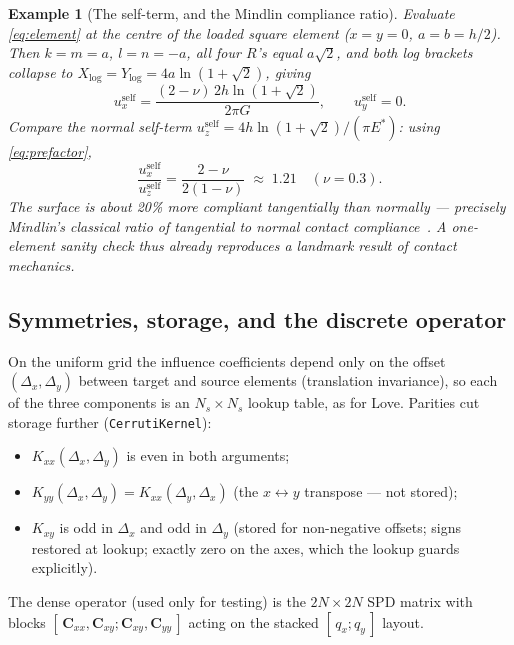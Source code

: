 \documentclass[11pt,a4paper]{article}
\newtheorem{example}[theorem]{Example}
\newcommand{\bC}{\mathbf{C}}
\newcommand{\Estar}{E^{*}}
\newcommand{\code}[1]{\texttt{#1}}
\begin{document}
\begin{example}[The self-term, and the Mindlin compliance ratio]
\label{ex:selfterm}
Evaluate \eqref{eq:element} at the centre of the loaded square element
($x=y=0$, $a=b=h/2$). Then $k=m=a$, $l=n=-a$, all four $R$'s equal
$a\sqrt2$, and both log brackets collapse to
$X_{\log} = Y_{\log} = 4a \ln(1+\sqrt2)$, giving
\begin{equation}
  u_x^{\text{self}} = \frac{(2-\nu)\, 2h \ln(1+\sqrt2)}{2\pi G},
  \qquad u_y^{\text{self}} = 0 .
\end{equation}
Compare the normal self-term $u_z^{\text{self}} = 4h\ln(1+\sqrt2)/(\pi\Estar)$:
using \eqref{eq:prefactor},
\begin{equation}
  \frac{u_x^{\text{self}}}{u_z^{\text{self}}}
  = \frac{2-\nu}{2(1-\nu)}
  \;\approx\; 1.21 \quad (\nu = 0.3).
\end{equation}
The surface is about 20\% \emph{more} compliant tangentially than normally
--- precisely Mindlin's classical ratio of tangential to normal contact
compliance~\cite{Mindlin1949,Johnson1985}. A one-element sanity check thus
already reproduces a landmark result of contact mechanics.
\end{example}

\subsection{Symmetries, storage, and the discrete operator}
\label{sec:symmetries}

On the uniform grid the influence coefficients depend only on the offset
$(\Delta_x, \Delta_y)$ between target and source elements (translation
invariance), so each of the three components is an $N_s\times N_s$ lookup
table, as for Love. Parities cut storage further
(\code{CerrutiKernel}):
\begin{itemize}
\item $K_{xx}(\Delta_x,\Delta_y)$ is even in both arguments;
\item $K_{yy}(\Delta_x,\Delta_y) = K_{xx}(\Delta_y,\Delta_x)$ (the
  $x\leftrightarrow y$ transpose --- not stored);
\item $K_{xy}$ is odd in $\Delta_x$ and odd in $\Delta_y$ (stored for
  non-negative offsets; signs restored at lookup; exactly zero on the axes,
  which the lookup guards explicitly).
\end{itemize}
The dense operator (used only for testing) is the $2N\times2N$ SPD matrix
with blocks $[\,\bC_{xx}, \bC_{xy}; \bC_{xy}, \bC_{yy}\,]$ acting on the
stacked $[\,q_x; q_y\,]$ layout.
\end{document}
